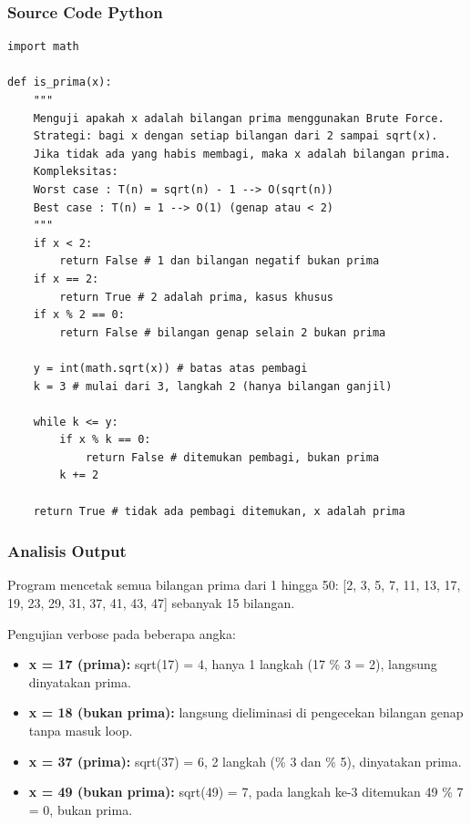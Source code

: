 \subsubsection*{Source Code Python}
\begin{lstlisting}[basicstyle=\ttfamily\scriptsize, frame=single, backgroundcolor=\color{white}, numbers=none, keywordstyle=\color{black}, commentstyle=\color{black}, stringstyle=\color{black}, breaklines=true]
import math

def is_prima(x):
    """
    Menguji apakah x adalah bilangan prima menggunakan Brute Force.
    Strategi: bagi x dengan setiap bilangan dari 2 sampai sqrt(x).
    Jika tidak ada yang habis membagi, maka x adalah bilangan prima.
    Kompleksitas:
    Worst case : T(n) = sqrt(n) - 1 --> O(sqrt(n))
    Best case : T(n) = 1 --> O(1) (genap atau < 2)
    """
    if x < 2:
        return False # 1 dan bilangan negatif bukan prima
    if x == 2:
        return True # 2 adalah prima, kasus khusus
    if x % 2 == 0:
        return False # bilangan genap selain 2 bukan prima
        
    y = int(math.sqrt(x)) # batas atas pembagi
    k = 3 # mulai dari 3, langkah 2 (hanya bilangan ganjil)
    
    while k <= y:
        if x % k == 0:
            return False # ditemukan pembagi, bukan prima
        k += 2
        
    return True # tidak ada pembagi ditemukan, x adalah prima
\end{lstlisting}

\subsubsection*{Analisis Output}
Program mencetak semua bilangan prima dari 1 hingga 50: [2, 3, 5, 7, 11, 13, 17, 19, 23, 29, 31, 37, 41, 43, 47] sebanyak 15 bilangan.

Pengujian verbose pada beberapa angka:
\begin{itemize}
    \item \textbf{x = 17 (prima):} sqrt(17) = 4, hanya 1 langkah (17 \% 3 = 2), langsung dinyatakan prima.
    \item \textbf{x = 18 (bukan prima):} langsung dieliminasi di pengecekan bilangan genap tanpa masuk loop.
    \item \textbf{x = 37 (prima):} sqrt(37) = 6, 2 langkah (\% 3 dan \% 5), dinyatakan prima.
    \item \textbf{x = 49 (bukan prima):} sqrt(49) = 7, pada langkah ke-3 ditemukan 49 \% 7 = 0, bukan prima.
\end{itemize}

